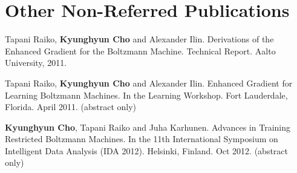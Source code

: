 \documentclass[11pt, oneside]{essay}
\begin{document}
\section{Other Non-Referred Publications}

Tapani Raiko, \textbf{Kyunghyun Cho} and Alexander Ilin.
Derivations of the Enhanced Gradient for the Boltzmann
Machine.  Technical Report. Aalto University, 2011.

Tapani Raiko, \textbf{Kyunghyun Cho} and Alexander Ilin.
Enhanced Gradient for Learning Boltzmann Machines.
In the Learning Workshop. Fort Lauderdale, Florida. April
2011. (abstract only)

\textbf{Kyunghyun Cho}, Tapani Raiko and Juha Karhunen.
Advances in Training Restricted Boltzmann Machines.
In the 11th International Symposium on Intelligent Data
Analysis (IDA 2012). Helsinki, Finland. Oct 2012. (abstract
only)
\end{document}

